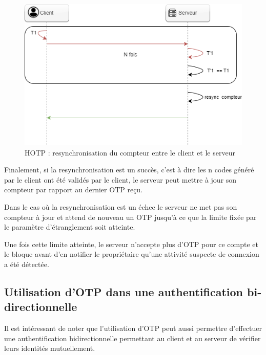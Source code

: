 \documentclass[a4paper, 10pt]{article}
\newcommand{\otp}{\textsc{OTP} }
\newcommand{\hotp}{\textsc{HOTP} }
\begin{document}
\begin{figure}[H]
        \centering
        \includegraphics[scale=0.5]{img/1/4/otp-resync.drawio.png}
        \caption{\hotp: resynchronisation du compteur entre le client et le serveur\\}
        \label{fig:hotp-resync}
\end{figure}


    Finalement, si la \textcolor{myblue}{resynchronisation est un succès}, c'est à dire les n codes généré par le client ont été validés par le client, 
le serveur peut \textcolor{mygreen}{mettre à jour son compteur} par rapport au dernier \otp reçu.

Dans le cas où la \textcolor{myblue}{resynchronisation est un échec} le serveur ne met pas son compteur à jour et \textcolor{mygreen}{attend de nouveau un \otp}
jusqu’à ce que la limite fixée par le \textcolor{mygreen}{paramètre d’étranglement soit atteinte}.

Une fois cette limite atteinte, le serveur n'accepte plus d'\otp pour ce compte et le bloque avant d'en notifier le propriétaire qu'une
attivité suspecte de connexion a été détectée.





        \subsection{Utilisation d'\otp dans une authentification bi-directionnelle}

    Il est intéressant de noter que l'utilisation d'\otp peut aussi permettre d'effectuer une \textcolor{myblue}{authentification bidirectionnelle}
permettant au client et au serveur de  \textcolor{mygreen}{vérifier leurs identités mutuellement}. 
\end{document}
